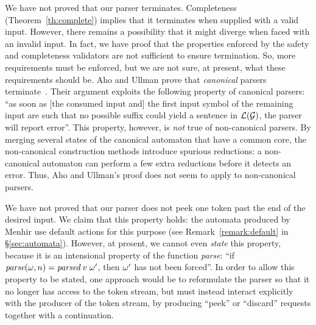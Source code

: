 \documentclass{llncs}
\begin{document}
We have not proved that our parser terminates. Completeness
(Theorem~\ref{th:complete}) implies that it terminates when supplied
with a valid input. However, there remains a possibility that it might diverge
when faced with an invalid input. In fact, we have proof that the properties
enforced by the safety and completeness validators are not sufficient to
ensure termination. So, more requirements must be enforced, but we are not
sure, at present, what these requirements should be.
%
%
Aho and Ullman prove that \emph{canonical} \lrone parsers
terminate~\cite[Theorem 5.13]{aho-ullman-72}. Their argument exploits the
following property of canonical \lrone parsers: ``as soon as [the consumed
input and] the first input symbol of the remaining input are such that no
possible suffix could yield a sentence in $\mathcal{L}(\mathcal{G})$, the parser will
report error''.
%
%
This property, however, is \emph{not} true of non-canonical \lrone parsers.
By merging several states of the canonical automaton that have a
common \lrzero core, the non-canonical construction methods introduce spurious
reductions: a non-canonical automaton can perform a few extra reductions
before it detects an error. Thus, Aho and Ullman's proof does not seem to
apply to non-canonical \lrone parsers.

We have not proved that our parser does not peek one token past the end of the
desired input. We claim that this property holds: the automata produced by
Menhir use default actions for this purpose (see
Remark~\ref{remark:default} in \S\ref{sec:automata}).
However, at present, we cannot even \emph{state}
this property, because it is an intensional property of the
function \textit{parse}: ``if $\textit{parse}(\omega, n)=\textit{parsed}\;v\;\omega'$, then
$\omega'$ has not been forced''. In order to allow this property to be
stated, one approach would be to reformulate the parser so that it no longer
has access to the token stream, but must instead interact explicitly with the
producer of the token stream, by producing ``peek'' or ``discard'' requests
together with a continuation.
\end{document}
